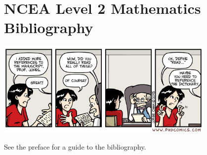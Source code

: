 


\section*{NCEA Level 2 Mathematics\\Bibliography}

\begin{center}
  \includegraphics[width=0.8\textwidth]{biblio}
\end{center}

See the preface for a guide to the bibliography.

